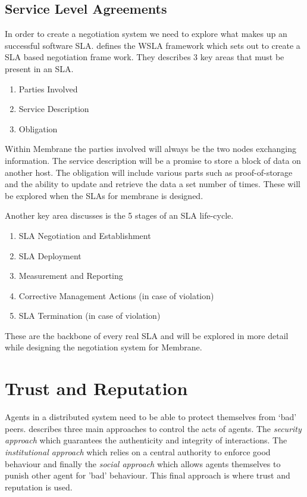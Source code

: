 \documentclass[11pt, a4paper, twoside]{report}
\begin{document}
\subsection{Service Level Agreements}

In order to create a negotiation system we need to explore what makes up an successful software SLA. \cite{keller2002defining} defines the WSLA framework which sets out to create a SLA based negotiation frame work.
They describes 3 key areas that must be present in an SLA.
\begin{enumerate}
 \item Parties Involved
 \item Service Description
 \item Obligation
\end{enumerate}

Within Membrane the parties involved will always be the two nodes exchanging information. The service description will be a promise to store a block of data on another host. The obligation will include various parts such as proof-of-storage and the ability to update and retrieve the data a set number of times. These will be explored when the SLAs for membrane is designed.

Another key area \cite{keller2002defining} discusses is the 5 stages of an SLA life-cycle.

\begin{enumerate}
 \item SLA Negotiation and Establishment
 \item SLA Deployment
 \item Measurement and Reporting
 \item Corrective Management Actions (in case of violation)
 \item SLA Termination (in case of violation)
\end{enumerate}

These are the backbone of every real SLA and will be explored in more detail while designing the negotiation system for Membrane.

\section{Trust and Reputation}

Agents in a distributed system need to be able to protect themselves from `bad' peers. \cite{pinyol2013computational} describes three main approaches to control the acts of agents. The \emph{security approach} which guarantees the authenticity and integrity of interactions. The \emph{institutional approach} which relies on a central authority to enforce good behaviour and finally the \emph{social approach} which allows agents themselves to punish other agent for 'bad' behaviour. This final approach is where trust and reputation is used.
\end{document}
